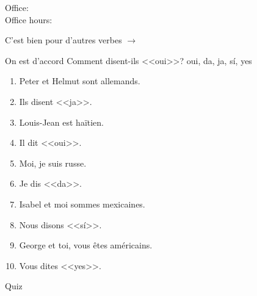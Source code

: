\documentclass{beamer}
\subtitle[\lexi{Écrire}, \lexi{lire}, \lexi{dire}]{Les verbes \lexi{écrire}, \lexi{lire} et \lexi{dire}}
\begin{document}
  \begin{frame}
    \titlepage
    \tiny{Office: \\
          Office hours: }
  \end{frame}

  \begin{frame}{}
    \begin{center}
      
    \end{center}
    C'est bien pour d'autres verbes $\to$ 
  \end{frame}

  \begin{frame}{}
    \begin{center}
      
    \end{center}
  \end{frame}

  \begin{frame}{}
    \begin{center}
      
    \end{center}
  \end{frame}

  \begin{frame}{On est d'accord}
    Comment disent-ils <<oui>>? \alert{oui, da, ja, sí, yes}
      \begin{enumerate}
        \item Peter et Helmut sont allemands.
        \item<2->[$\to$] Ils disent <<ja>>.
        \item<3-> Louis-Jean est haïtien.
        \item<4->[$\to$] Il dit <<oui>>.
        \item<5-> Moi, je suis russe.
        \item<6->[$\to$] Je dis <<da>>.
        \item<7-> Isabel et moi sommes mexicaines.
        \item<8->[$\to$] Nous disons <<sí>>.
        \item<9-> George et toi, vous êtes américains.
        \item<10->[$\to$] Vous dites <<yes>>.
      \end{enumerate}
  \end{frame}

  \begin{frame}{}
    \begin{center}
      \Large Quiz
    \end{center}
  \end{frame}
\end{document}
